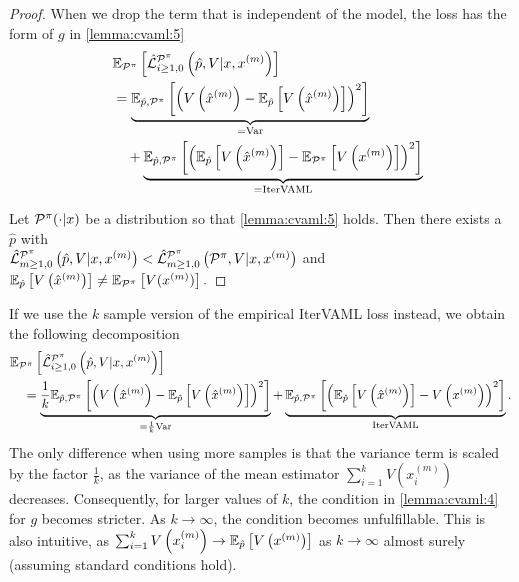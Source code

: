 \begin{proof}
When we drop the term that is independent of the model, the loss has the form of $g$ in \autoref{lemma:cvaml:5}
\begin{align}
   & \EEX{\P^\pi}{\hat{\mathcal{L}}^{\P^\pi}_{i\geq1,0}\left(\hat{p},V|x,x^{(m)}\right)} \\
   \quad & =  \underbrace{\EEX{\hat{p},\P^\pi}{\left(V\left(\hat{x}^{(m)}\right) - \EEX{\hat{p}}{V\left(\hat{x}^{(m)}\right)}\right)^2}}_{= \mathrm{Var}}  \\
   \quad & \quad +\underbrace{\EEX{\hat{p},\P^\pi}{\left(\EEX{\hat{p}}{V\left(\hat{x}^{(m)}\right)} - \EEX{\P^\pi}{V\left(x^{(m)}\right)}\right)^2}}_{= \mathrm{IterVAML}}
\end{align}

Let $\P^\pi(\cdot|x)$ be a distribution so that \autoref{lemma:cvaml:5} holds. 
Then there exists a $\hat{p}$ with \\$\hat{\mathcal{L}}^{\P^\pi}_{m\geq1,0}\left(\hat{p},V|x,x^{(m)}\right) < \hat{\mathcal{L}}^{\P^\pi}_{m\geq1,0}\left(\P^\pi,V|x,x^{(m)}\right)$ and $\EEX{\hat{p}}{V\left(\hat{x}^{(m)}\right)} \neq \EEX{\P^\pi}{V(x^{(m)})}.$
\end{proof}

If we use the $k$ sample version of the empirical IterVAML loss instead, we obtain the following decomposition
\begin{align}
    &\EEX{\P^\pi}{\hat{\mathcal{L}}^{\P^\pi}_{i\geq1,0}\left(\hat{p},V|x,x^{(m)}\right)} \\
    &\quad = \underbrace{\frac{1}{k}\EEX{\hat{p},\P^\pi}{\left(V\left(\hat{x}^{(m)}\right) - \EEX{\hat{p}}{V\left(\hat{x}^{(m)}\right)}\right)^2}}_{=\frac{1}{k} \mathrm{Var}} + \underbrace{\EEX{\hat{p},\P^\pi}{\left(\EEX{\hat{p}}{V\left(\hat{x}^{(m)}\right)} - V\left(x^{(m)}\right)\right)^2}}_{\mathrm{IterVAML}}.
\end{align}
The only difference when using more samples is that the variance term is scaled by the factor $\frac{1}{k}$, as the variance of the mean estimator $\sum_{i=1}^k V\left(x^{(m)}_i\right)$ decreases.
Consequently, for larger values of $k$, the condition in \autoref{lemma:cvaml:4} for $g$ becomes stricter.
As $k \rightarrow \infty$, the condition becomes unfulfillable. 
This is also intuitive, as $\sum_{i=1}^k V\left(x^{(m)}_i\right) \rightarrow \EEX{\hat{p}}{V\left(x^{(m)}\right)}$ as $k \rightarrow \infty$ almost surely (assuming standard conditions hold).


